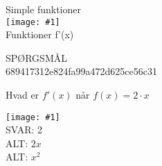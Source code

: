 \documentclass[]{article}
\newenvironment{question}[2]{SPØRGSMÅL\\}{\hspace{50px}}
\newcommand{\name}[1]{{\huge #1}\\}
\newcommand{\tag}[1]{#1}
\newcommand{\cover}[1]{\texttt{[image: \#1]}\\}
\newcommand{\image}[1]{\texttt{[image: \#1]}\\}
\newcommand{\answer}[1]{{\color{green} SVAR: #1}\\}
\newcommand{\alt}[1]{{\color{red} ALT: #1}\\}
\begin{document}
\name{Simple funktioner}
\cover{test.png}
\tag{Funktioner}
\tag{f'(x)}

\begin{question}{multi}\id{689417312e824fa99a472d625ce56c31}
    
Hvad er $f'(x)$ når $f(x)=2\cdot x$

\image{test.png}

\answer{2}
\alt{$2x$}
\alt{$x^2$}

\end{question}
\end{document}
